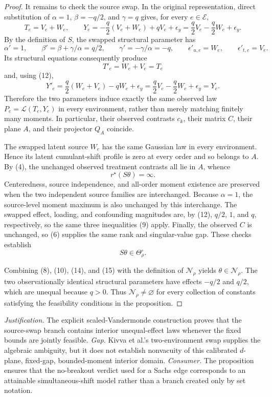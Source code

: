 \documentclass{article}
\begin{document}
\begin{proof}
It remains to check the source swap.  In the original representation, direct substitution of \(\alpha=1\), \(\beta=-q/2\), and \(\gamma=q\) gives, for every \(e\in\mathcal E\),
\[
 T_e=V_e+W_e,
 \qquad
 Y_e=-\frac q2(V_e+W_e)+qV_e+\epsilon_y
     =\frac q2V_e-\frac q2W_e+\epsilon_y.                       \tag{11}
\]
By the definition of \(S\), the swapped structural parameter has
\[
 \alpha'=1,
 \qquad
 \beta'=\beta+\gamma/\alpha=q/2,
 \qquad
 \gamma'=-\gamma/\alpha=-q,
 \qquad
 \epsilon'_{u,e}=W_e,
 \qquad
 \epsilon'_{t,e}=V_e.                                          \tag{12}
\]
Its structural equations consequently produce
\[
 T'_e=W_e+V_e=T_e
\]
and, using (12),
\[
 Y'_e=\frac q2(W_e+V_e)-qW_e+\epsilon_y
     =\frac q2V_e-\frac q2W_e+\epsilon_y
     =Y_e.                                                       \tag{13}
\]
Therefore the two parameters induce exactly the same observed law \(P_e=\mathcal L(T_e,Y_e)\) in every environment, rather than merely matching finitely many moments.  In particular, their observed contrasts \(c_k\), their matrix \(C\), their plane \(A\), and their projector \(Q_A\) coincide.

The swapped latent source \(W_e\) has the same Gaussian law in every environment.  Hence its latent cumulant-shift profile is zero at every order and so belongs to \(A\).  By (4), the unchanged observed treatment contrasts all lie in \(A\), whence
\[
 r^\star(S\theta)=\infty.                                      \tag{14}
\]
Centeredness, source independence, and all-order moment existence are preserved when the two independent source families are interchanged.  Because \(\alpha=1\), the source-level moment maximum is also unchanged by this interchange.  The swapped effect, loading, and confounding magnitudes are, by (12), \(q/2\), \(1\), and \(q\), respectively, so the same three inequalities (9) apply.  Finally, the observed \(C\) is unchanged, so (6) supplies the same rank and singular-value gap.  These checks establish
\[
 S\theta\in\Theta_\rho^\circ.                                \tag{15}
\]

Combining (8), (10), (14), and (15) with the definition of \(\mathcal N_\rho\) yields \(\theta\in\mathcal N_\rho\).  The two observationally identical structural parameters have effects \(-q/2\) and \(q/2\), which are unequal because \(q>0\).  Thus \(\mathcal N_\rho\neq\varnothing\) for every collection of constants satisfying the feasibility conditions in the proposition.
\end{proof}
\par\smallskip\noindent \textit{Justification.} The explicit scaled-Vandermonde construction proves that the source-swap branch contains interior unequal-effect laws whenever the fixed bounds are jointly feasible. \textit{Gap.} Kivva et al.'s two-environment swap supplies the algebraic ambiguity, but it does not establish nonvacuity of this calibrated \(d\)-plane, fixed-gap, bounded-moment interior domain. \textit{Consumer.} The proposition ensures that the no-breakout verdict used for a Sachs edge corresponds to an attainable simultaneous-shift model rather than a branch created only by set notation.
\end{document}

